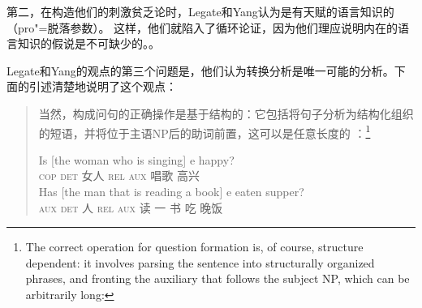 第二，在构造他们的刺激贫乏论时，Legate和Yang认为是有天赋的语言知识的（pro"=脱落参数）。
这样，他们就陷入了循环论证，因为他们理应说明内在的语言知识的假说是不可缺少的。\citep[]{SP2002b}。

Legate和Yang的观点的第三个问题是，他们认为转换分析是唯一可能的分析。下面的引述清楚地说明了这个观点\citep[]{LY2002a}：
\begin{quotation}
当然，构成问句的正确操作是基于结构的：它包括将句子分析为结构化组织的短语，并将位于主语NP后的助词前置，这可以是任意长度的 ：\footnote{%
The correct operation for question formation is, of course, structure dependent: it involves parsing
the sentence into structurally organized phrases, and fronting the auxiliary that follows the
subject NP, which can be arbitrarily long:
}
\begin{exe}
\begin{xlist}
\ex 
\gll Is [the woman who is singing] e happy?\\
\textsc{cop} \spacebr\textsc{det} 女人 \textsc{rel} \textsc{aux} 唱歌 {} 高兴\\
\ex 
\gll Has [the man that is reading a book] e eaten supper?\\
\textsc{aux} \spacebr\textsc{det} 人 \textsc{rel} \textsc{aux} 读 一 书 {} 吃 晚饭\\
\end{xlist}
\end{exe}
\end{quotation}

